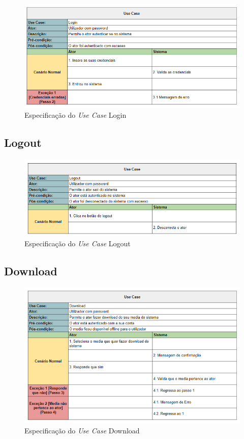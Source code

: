 \documentclass[a4paper]{report}
\begin{document}
\begin{figure}[H]
	\centering 
    \includegraphics[width=\textwidth]{images/Login.png}  
	\caption{Especificação do \emph{Use Case} Login}
\end{figure}

\subsection{Logout}

\begin{figure}[H]
	\centering 
    \includegraphics[width=\textwidth]{images/Logout.png}  
    \caption{Especificação do \emph{Use Case} Logout}
\end{figure}

\subsection{Download}

\begin{figure}[H]
	\centering 
    \includegraphics[width=\textwidth]{images/Download.png}  
    \caption{Especificação do \emph{Use Case} Download}
\end{figure}
\end{document}
